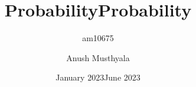 \documentclass{report}
\title{Probability}
\author{am10675 }
\date{January 2023}
\theoremstyle{remark}
\begin{document}
\title{\Large{\textbf{Probability}}}
\author{Anush Musthyala}
\date{June 2023}

\maketitle
\tableofcontents

\clearpage
{}










\end{document}
